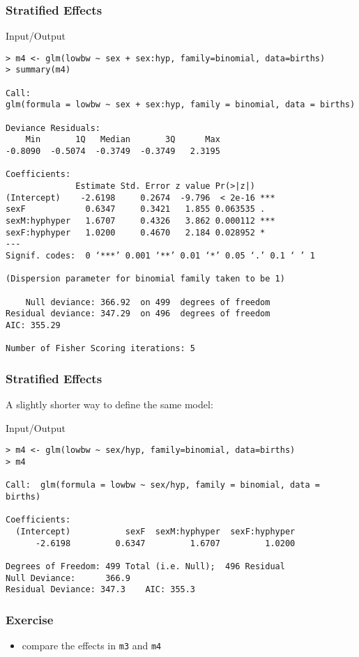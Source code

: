 \begin{frame}[fragile]\frametitle{Stratified Effects}
  \begin{exampleblock}{Input/Output}\footnotesize
\begin{verbatim}
> m4 <- glm(lowbw ~ sex + sex:hyp, family=binomial, data=births)
> summary(m4)

Call:
glm(formula = lowbw ~ sex + sex:hyp, family = binomial, data = births)

Deviance Residuals: 
    Min       1Q   Median       3Q      Max  
-0.8090  -0.5074  -0.3749  -0.3749   2.3195  

Coefficients:
              Estimate Std. Error z value Pr(>|z|)    
(Intercept)    -2.6198     0.2674  -9.796  < 2e-16 ***
sexF            0.6347     0.3421   1.855 0.063535 .  
sexM:hyphyper   1.6707     0.4326   3.862 0.000112 ***
sexF:hyphyper   1.0200     0.4670   2.184 0.028952 *  
---
Signif. codes:  0 ‘***’ 0.001 ‘**’ 0.01 ‘*’ 0.05 ‘.’ 0.1 ‘ ’ 1

(Dispersion parameter for binomial family taken to be 1)

    Null deviance: 366.92  on 499  degrees of freedom
Residual deviance: 347.29  on 496  degrees of freedom
AIC: 355.29

Number of Fisher Scoring iterations: 5
\end{verbatim}
  \end{exampleblock}
\end{frame}


\begin{frame}[fragile]\frametitle{Stratified Effects}
A slightly shorter way to define the same model:
  \begin{exampleblock}{Input/Output}\footnotesize
\begin{verbatim}
> m4 <- glm(lowbw ~ sex/hyp, family=binomial, data=births)
> m4

Call:  glm(formula = lowbw ~ sex/hyp, family = binomial, data = births)

Coefficients:
  (Intercept)           sexF  sexM:hyphyper  sexF:hyphyper  
      -2.6198         0.6347         1.6707         1.0200  

Degrees of Freedom: 499 Total (i.e. Null);  496 Residual
Null Deviance:	    366.9 
Residual Deviance: 347.3 	AIC: 355.3
\end{verbatim}
  \end{exampleblock}
\end{frame}


\begin{frame}[fragile]\frametitle{Exercise}
\begin{itemize}
\item compare the effects in \texttt{m3} and \texttt{m4}
\end{itemize}
\end{frame}


